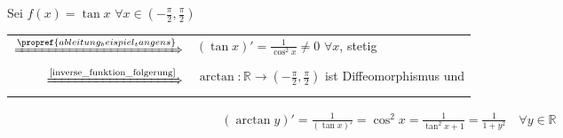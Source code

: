 \begin{example}
	Sei $f(x) = \tan x$ $\forall x\in \left( -\frac{\pi}{2}, \frac{\pi}{2}\right)$ \\
	\begin{tabularx}{\linewidth}{r@{\ \ }X}
	$\xRightarrow{\propref{ableitung_beispiel_tangens}}$ & $(\tan x)' = \frac{1}{\cos^2 x} \neq 0$ $\forall x$, stetig \\
	$\xRightarrow{\text{\cref{inverse_funktion_folgerung}}}$&  $\arctan: \mathbb{R}\to \left( -\frac{\pi}{2}, \frac{\pi}{2}\right)$ ist Diffeomorphismus und \end{tabularx} \begin{align*}
		(\arctan y)' = \frac{1}{(\tan x)'} = \cos^2 x = \frac{1}{\tan^2 x + 1} = \frac{1}{1 + y^2}\quad\forall y\in\mathbb{R}
	\end{align*}
\end{example}

